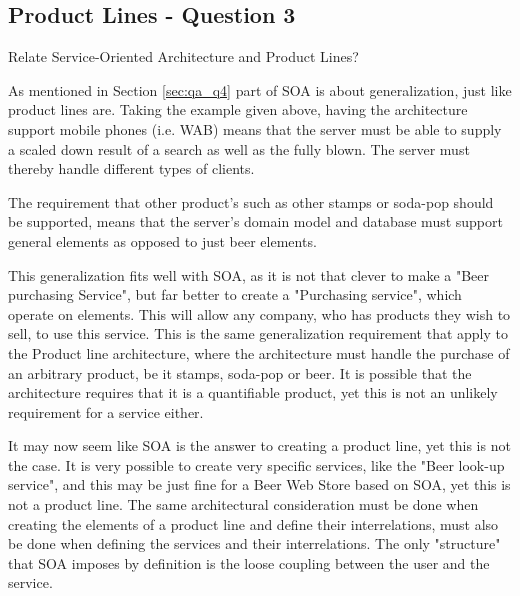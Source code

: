 \subsection{Product Lines - Question 3}

\begin{question}
Relate Service-Oriented Architecture and Product Lines?
\end{question}

As mentioned in Section \ref{sec:qa_q4} part of SOA is about generalization, just like product lines are. Taking the example given above, having the architecture support mobile phones (i.e. WAB) means that the server must be able to supply a scaled down result of a search as well as the fully blown. The server must thereby handle different types of clients.

The requirement that other product's such as other stamps or soda-pop should be supported, means that the server's domain model and database must support general elements as opposed to just beer elements.

This generalization fits well with SOA, as it is not that clever to make a "Beer purchasing Service", but far better to create a "Purchasing service", which operate on elements. This will allow any company, who has products they wish to sell, to use this service. This is the same generalization requirement that apply to the Product line architecture, where the architecture must handle the purchase of an arbitrary product, be it stamps, soda-pop or beer. It is possible that the architecture requires that it is a quantifiable product, yet this is not an unlikely requirement for a service either.

It may now seem like SOA is the answer to creating a product line, yet this is not the case. It is very possible to create very specific services, like the "Beer look-up service", and this may be just fine for a Beer Web Store based on SOA, yet this is not a product line. The same architectural consideration must be done when creating the elements of a product line and define their interrelations, must also be done when defining the services and their interrelations. The only "structure" that SOA imposes by definition is the loose coupling between the user and the service.
